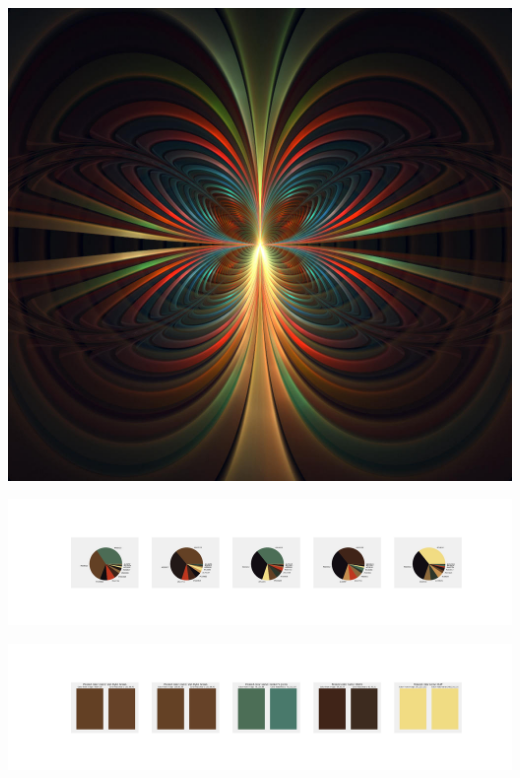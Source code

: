 \documentclass[11pt]{article}
\begin{document}
\begin{landscape}
    \begin{center}
    \includegraphics[width=\textwidth]{./nbimg/file (84).jpg}
    \end{center}

    \begin{center}
    \includegraphics[width=250mm]{./nbimg/pie-434.jpg}
    \end{center}

    \begin{center}
    \includegraphics[width=250mm]{./nbimg/peak-434.jpg}
    \end{center}
    


\end{landscape}
\end{document}
